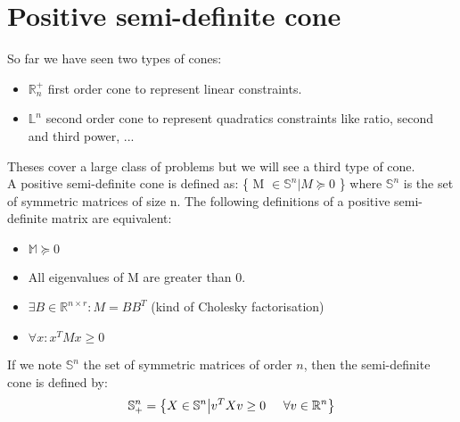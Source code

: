 %
%
%
%
%


\section{Positive semi-definite cone}

So far we have seen two types of cones: 
\begin{itemize}
\item $\mathbb{R}_n^+$ first order cone to represent linear constraints.
\item $\mathbb{L}^n$ second order cone to represent quadratics constraints like ratio, second and third power, ...
\end{itemize}
Theses cover a large class of problems but we will see a third type of cone.\\ 

A positive semi-definite cone is defined as: \{ M $\in \mathbb{S}^n | M \succeq 0 $ \} where $ \mathbb{S}^n$ is the set of symmetric matrices of size n. 
The following definitions of a positive semi-definite matrix are equivalent:
\begin{itemize}
\item $\mathbb{M} \succeq 0 $
\item All eigenvalues of M are greater than 0.
\item $\exists B \in \mathbb{R}^{n \times r}: M = BB^T  $ (kind of Cholesky factorisation)
\item $\forall x: x^T M x \geq 0$  
\end{itemize}

If we note $\mathbb{S}^n$ the set of symmetric matrices of order $n$, then the semi-definite cone is defined by:
\begin{equation*}
\mathbb{S}^n_+ = \left\lbrace X \in \mathbb{S}^n  \big|  v^TXv \geq 0 \hspace{5mm} \forall v\in \mathbb{R}^n \right\rbrace
\end{equation*}

